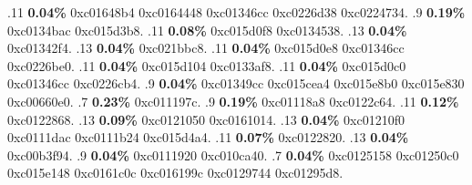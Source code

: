 \begin{profile}
{.11 \textbf{0.04\%} 0xc01648b4\newline {} 0xc0164448\newline {} 0xc01346cc\newline {} 0xc0226d38\newline {} 0xc0224734. 
.9 \textbf{0.19\%} 0xc0134bac\newline {} 0xc015d3b8. 
.11 \textbf{0.08\%} 0xc015d0f8\newline {} 0xc0134538. 
.13 \textbf{0.04\%} 0xc01342f4. 
.13 \textbf{0.04\%} 0xc021bbc8. 
.11 \textbf{0.04\%} 0xc015d0e8\newline {} 0xc01346cc\newline {} 0xc0226be0. 
.11 \textbf{0.04\%} 0xc015d104\newline {} 0xc0133af8. 
.11 \textbf{0.04\%} 0xc015d0c0\newline {} 0xc01346cc\newline {} 0xc0226cb4. 
.9 \textbf{0.04\%} 0xc01349cc\newline {} 0xc015cea4\newline {} 0xc015e8b0\newline {} 0xc015e830\newline {} 0xc00660e0. 
.7 \textbf{0.23\%} 0xc011197c. 
.9 \textbf{0.19\%} 0xc01118a8\newline {} 0xc0122c64. 
.11 \textbf{0.12\%} 0xc0122868. 
.13 \textbf{0.09\%} 0xc0121050\newline {} 0xc0161014. 
.13 \textbf{0.04\%} 0xc01210f0\newline {} 0xc0111dac\newline {} 0xc0111b24\newline {} 0xc015d4a4. 
.11 \textbf{0.07\%} 0xc0122820. 
.13 \textbf{0.04\%} 0xc00b3f94. 
.9 \textbf{0.04\%} 0xc0111920\newline {} 0xc010ca40. 
.7 \textbf{0.04\%} 0xc0125158\newline {} 0xc01250c0\newline {} 0xc015e148\newline {} 0xc0161c0c\newline {} 0xc016199c\newline {} 0xc0129744\newline {} 0xc01295d8. 
}
\end{profile}
